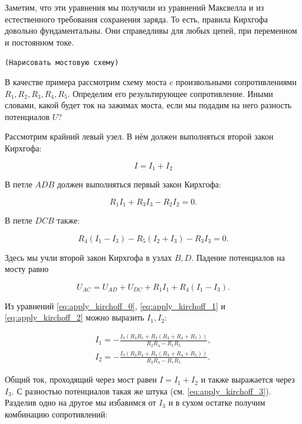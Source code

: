 \documentclass[11pt,a4paper]{article}
\numberwithin{equation}{section}
\newcommand{\nn}{\nonumber}
\newcommand{\com}[1]{{\Large{\texttt{{\color{red}(#1)}}}}}
\begin{document}
Заметим, что эти уравнения мы получили из уравнений Максвелла и из
естественного требования сохранения заряда. То есть, правила Кирхгофа
довольно фундаментальны. Они справедливы для любых цепей, при
переменном и постоянном токе. 

\com{Нарисовать мостовую схему}

В качестве примера рассмотрим схему моста c произвольными
сопротивлениями $R_1, R_2, R_3, R_4, R_5$. Определим его
результирующее сопротивление. Иными словами, какой будет ток на
зажимах моста, если мы подадим на него разность потенциалов $U$?

Рассмотрим крайний левый узел. В нём должен выполняться второй закон
Кирхгофа:

\begin{equation}
  \label{eq:apply_kirchoff_0}
  I = I_1 + I_2
\end{equation}

В петле $ADB$ должен выполняться первый закон Кирхгофа:

\begin{equation}
  \label{eq:apply_kirchoff_1}
  R_1 I_1 + R_3 I_3 -R_2 I_2 = 0.
\end{equation}

В петле $DCB$ также:

\begin{equation}
  \label{eq:apply_kirchoff_2}
  R_4 (I_1 - I_3) - R_5 (I_2 + I_3) -R_3 I_3 =0.
\end{equation}

Здесь мы учли второй закон Кирхгофа в узлах $B,D$. Падение потенциалов на
мосту равно 

\begin{equation}
  \label{eq:apply_kirchoff_3}
  U_{AC} = U_{AD} + U_{DC} + R_1 I_1 + R_4 (I_1 -I_3).
\end{equation}

Из уравнений \eqref{eq:apply_kirchoff_0}, \eqref{eq:apply_kirchoff_1}
и \eqref{eq:apply_kirchoff_2} можно выразить $I_1, I_2$:

\begin{eqnarray}
  \label{eq:apply_kirchoff_currents}
  \nn
  I_1 = -\frac{I_3 (R_3 R_5 + R_2 (R_3 + R_4 + R_5))}{R_2 R_4 -R_1
    R_5},\\
  I_2 = -\frac{I_3 (R_3 R_4 + R_1 (R_3 + R_4 + R_5))}{R_2 R_4 -R_1
    R_5}.
\end{eqnarray}

Общий ток, проходящий через мост равен $I=I_1 + I_2$ и также
выражается через $I_3$. С разностью потенциалов такая же штука
(см. \eqref{eq:apply_kirchoff_3}). Разделив одно на другое мы
избавимся от $I_3$ и в сухом остатке получим комбинацию сопротивлений:
\end{document}
